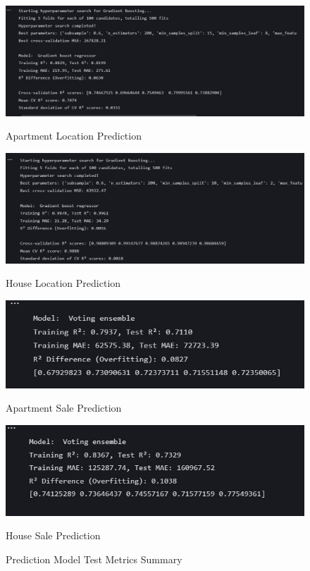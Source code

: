 \begin{figure}[htbp]
    \centering
    \begin{minipage}{0.48\textwidth}
        \centering
        \includegraphics[width=\linewidth]{images/apartmenet location.jpeg}
        \caption*{Apartment Location Prediction}
    \end{minipage}
    \hfill
    \begin{minipage}{0.48\textwidth}
        \centering
        \includegraphics[width=\linewidth]{images/maison location.jpeg}
        \caption*{House Location Prediction}
    \end{minipage}
    
    \vspace{0.5cm}
    
    \begin{minipage}{0.48\textwidth}
        \centering
        \includegraphics[width=\linewidth]{images/apartmeent vente.jpeg}
        \caption*{Apartment Sale Prediction}
    \end{minipage}
    \hfill
    \begin{minipage}{0.48\textwidth}
        \centering
        \includegraphics[width=\linewidth]{images/maison vente.jpeg}
        \caption*{House Sale Prediction}
    \end{minipage}
    
    \caption{Prediction Model Test Metrics Summary}
    \label{fig:model-test-metrics}
\end{figure}
